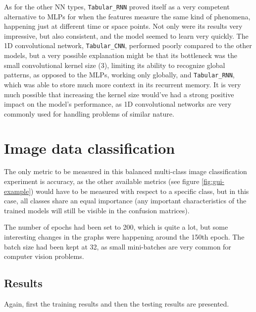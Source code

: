 As for the other NN types, \texttt{Tabular\_RNN} proved itself as a very competent alternative to MLPs for when
the features measure the same kind of phenomena, happening just at different time or space points.
Not only were its results very impressive, but also consistent, and the model seemed to learn very quickly.
The 1D convolutional network, \texttt{Tabular\_CNN}, performed poorly compared to the other models, but
a very possible explanation might be that its bottleneck was the small convolutional kernel size (3),
limiting its ability to recognize global patterns, as opposed to the MLPs, working only globally,
and \texttt{Tabular\_RNN}, which was able to store much more context in its recurrent memory.
It is very much possible that increasing the kernel size would've had a strong positive impact on the model's
performance, as 1D convolutional networks are very commonly used for handling problems of similar nature.




\section{Image data classification}
\label{image-data-classification}
The only metric to be measured in this balanced multi-class image classification experiment is
accuracy, as the other available metrics (see figure \ref{fig:gui-example}) would have to be measured
with respect to a specific class, but in this case, all classes share an equal importance
(any important characteristics of the trained models will still be visible in the confusion matrices).

The number of epochs had been set to 200, which is quite a lot, but some interesting changes in the graphs
were happening around the 150th epoch. The batch size had been kept at 32, as small mini-batches are very
common for computer vision problems.


\subsection{Results}
Again, first the training results and then the testing results are presented.
\pagebreak

